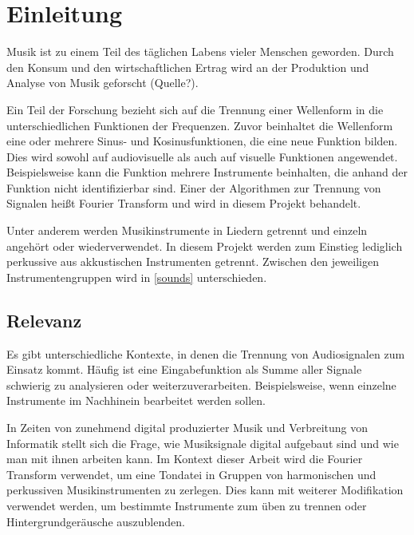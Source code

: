 \chapter{Einleitung}
%

Musik ist zu einem Teil des täglichen Labens vieler Menschen geworden. Durch den Konsum und den wirtschaftlichen Ertrag wird an der Produktion und Analyse von Musik geforscht (Quelle?).

\par

Ein Teil der Forschung bezieht sich auf die Trennung einer Wellenform in die unterschiedlichen Funktionen der Frequenzen. Zuvor beinhaltet die Wellenform eine oder mehrere Sinus- und Kosinusfunktionen, die eine neue Funktion bilden. Dies wird sowohl auf audiovisuelle als auch auf visuelle Funktionen angewendet. Beispielsweise kann die Funktion mehrere Instrumente beinhalten, die anhand der Funktion nicht identifizierbar sind. Einer der Algorithmen zur Trennung von Signalen heißt Fourier Transform und wird in diesem Projekt behandelt.

\par

Unter anderem werden Musikinstrumente in Liedern getrennt und einzeln angehört oder wiederverwendet. In diesem Projekt werden zum Einstieg lediglich perkussive aus akkustischen Instrumenten getrennt. Zwischen den jeweiligen Instrumentengruppen wird in \cref{sounds} unterschieden.

%
\section{Relevanz}
%

Es gibt unterschiedliche Kontexte, in denen die Trennung von Audiosignalen zum Einsatz kommt. Häufig ist eine Eingabefunktion als Summe aller Signale schwierig zu analysieren oder weiterzuverarbeiten. Beispielsweise, wenn einzelne Instrumente im Nachhinein bearbeitet werden sollen.

\par

In Zeiten von zunehmend digital produzierter Musik und Verbreitung von Informatik stellt sich die Frage, wie Musiksignale digital aufgebaut sind und wie man mit ihnen arbeiten kann. Im Kontext dieser Arbeit wird die Fourier Transform verwendet, um eine Tondatei in Gruppen von harmonischen und perkussiven Musikinstrumenten zu zerlegen. Dies kann mit weiterer Modifikation verwendet werden, um bestimmte Instrumente zum üben zu trennen oder Hintergrundgeräusche auszublenden.

